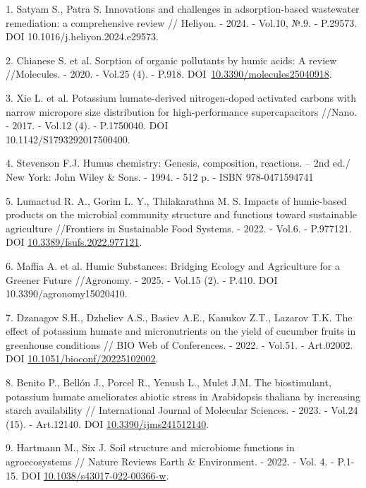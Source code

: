 \begin{references}
1. Satyam S., Patra S. Innovations and challenges in adsorption-based
wastewater remediation: a compre\-hensive review // Heliyon. - 2024. -
Vol.10, №.9. - P.29573. DOI 10.1016/j.heliyon.2024.e29573.

2. Chianese S. et al. Sorption of organic pollutants by humic acids: A
review //Molecules. - 2020. - Vol.25 (4). - P.918.
DOI~\href{https://doi.org/10.3390/molecules25040918}{10.3390/molecules25040918}.

3. Xie L. et al. Potassium humate-derived nitrogen-doped activated
carbons with narrow micropore size distribution for high-performance
supercapacitors //Nano. - 2017. - Vol.12 (4). - P.1750040. DOI\\
10.1142/S1793292017500400.

4. Stevenson F.J. Humus chemistry: Genesis, composition, reactions. --
2nd ed./ New York: John Wiley \& Sons. - 1994. - 512 p. - ISBN
978-0471594741

5. Lumactud R. A., Gorim L. Y., Thilakarathna M. S. Impacts of
humic-based products on the microbial community structure and
functions toward sustainable agriculture //Frontiers in Sustainable
Food Systems. - 2022. - Vol.6. - P.977121. DOI
\href{https://doi.org/10.3389/fsufs.2022.977121}{10.3389/fsufs.2022.977121}.

6. Maffia A. et al. Humic Substances: Bridging Ecology and Agriculture
for a Greener Future //Agronomy. - 2025. - Vol.15 (2). - P.410. DOI
10.3390/agronomy15020410.

7. Dzanagov S.H., Dzheliev A.S., Basiev A.E., Kanukov Z.T., Lazarov T.K.
The effect of potassium humate and micronutrients on the yield of
cucumber fruits in greenhouse conditions // BIO Web of Conferences. -
2022. - Vol.51. - Art.02002. DOI
\href{https://doi.org/10.1051/bioconf/20225102002}{10.1051/bioconf/20225102002}.

8. Benito P., Bellón J., Porcel R., Yenush L., Mulet J.M. The
biostimulant, potassium humate ameliorates abiotic stress in
Arabidopsis thaliana by increasing starch availability //
International Journal of Molecular Sciences. - 2023. - Vol.24 (15). -
Art.12140. DOI
\href{https://doi.org/10.3390/ijms241512140}{10.3390/ijms241512140}.

9. Hartmann M., Six J. Soil structure and microbiome functions in
agroecosystems // Nature Reviews Earth \& Environment. - 2022. - Vol.
4. - P.1-15. DOI
\href{http://dx.doi.org/10.1038/s43017-022-00366-w}{10.1038/s43017-022-00366-w}.


\end{references}
